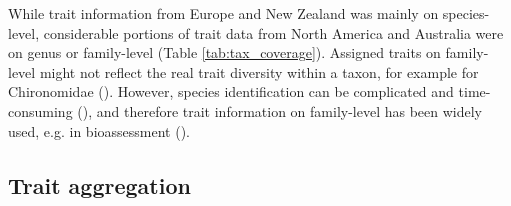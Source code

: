 \documentclass{article}
\begin{document}
While trait information from Europe and New Zealand was mainly on species-level, considerable portions of trait data from North America and Australia were on genus or family-level (Table \ref{tab:tax_coverage}). Assigned traits on family-level might not reflect the real trait diversity within a taxon, for example for Chironomidae (\cite{serra_synthesising_2016}). However, species identification can be complicated and time-consuming (\cite{marshall_taxonomic_2006, resh_which_2008}), and therefore trait information on family-level has been widely used, e.g. in bioassessment (\cite{beketov_spear_2009}).


\subsection*{Trait aggregation}
\end{document}
